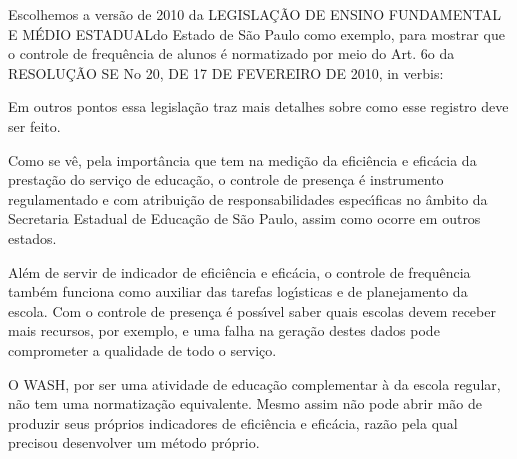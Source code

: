 \documentclass[
12pt,		%
openright,	%
twoside,  %
a4paper,			%
chapter=TITLE,		%
english,			%
french,				%
spanish,			%
brazil				%
]{USPSC-classe/USPSC}
\begin{document}
Escolhemos a vers\~ao de 2010 da \textquotedbl LEGISLA\c{C}\~AO DE ENSINO FUNDAMENTAL E M\'EDIO ESTADUAL\textquotedbl  do Estado de S\~ao Paulo como exemplo, para mostrar que o controle de frequ\^encia de alunos \'e normatizado por meio do Art. 6o da RESOLU\c{C}\~AO SE No 20, DE 17 DE FEVEREIRO DE 2010, in verbis:











\noindent\begin{center}\mbox{\centering{}}\end{center}


Em outros pontos essa legisla\c{c}\~ao traz mais detalhes sobre como esse registro deve ser feito.










Como se v\^e, pela import\^ancia que tem na medi\c{c}\~ao da efici\^encia e efic\'acia da presta\c{c}\~ao do servi\c{c}o de educa\c{c}\~ao, o controle de presen\c{c}a \'e instrumento regulamentado e com atribui\c{c}\~ao de responsabilidades espec\'{\i}ficas no \^ambito da Secretaria Estadual de Educa\c{c}\~ao de S\~ao Paulo, assim como ocorre em outros estados.










Al\'em de servir de indicador de efici\^encia e efic\'acia, o controle de frequ\^encia tamb\'em funciona como auxiliar das tarefas log\'{\i}sticas e de planejamento da escola. Com o controle de presen\c{c}a \'e poss\'{\i}vel saber quais escolas devem receber mais recursos, por exemplo, e uma falha na gera\c{c}\~ao destes dados pode comprometer a qualidade de todo o servi\c{c}o.










O WASH, por ser uma atividade de educa\c{c}\~ao complementar \`a da escola regular, n\~ao tem uma normatiza\c{c}\~ao equivalente. Mesmo assim n\~ao pode abrir m\~ao de produzir seus pr\'oprios indicadores de efici\^encia e efic\'acia, raz\~ao pela qual  precisou desenvolver um m\'etodo pr\'oprio.
\end{document}
